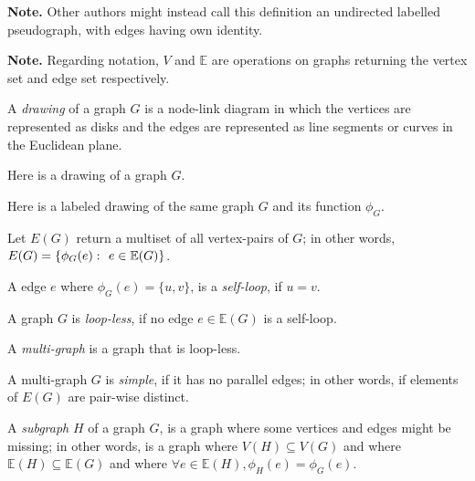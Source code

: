 \documentclass{article}
\begin{document}
	\textbf{Note.} Other authors might instead call this definition an undirected labelled pseudograph, with edges having own identity.
	
	\textbf{Note.} Regarding notation, $V$ and $\mathbb{E}$ are operations on graphs returning the vertex set and edge set respectively.

	A \textit{drawing} of a graph $G$ is a node-link diagram in which the vertices are represented as disks and the edges are represented as line segments or curves in the Euclidean plane.

	Here is a drawing of a graph $G$.

	\begin{center}
		
	\end{center}

	Here is a labeled drawing of the same graph $G$ and its function $\phi_G$.

	\begin{center}
		
	\end{center}

	Let $E(G)$ return a multiset of all vertex-pairs of $G$; in other words, $E(G) = \{\phi_G(e) \,\colon\  e \in \mathbb{E}(G)\}$.

	A edge $e$ where $\phi_G(e) = \{u,v\}$, is a \textit{self-loop}, if $u = v$.

	A graph $G$ is \textit{loop-less}, if no edge $e \in \mathbb{E}(G)$ is a self-loop.

	A \textit{multi-graph} is a graph that is loop-less.

	\begin{center}
		
	\end{center}

	A multi-graph $G$ is \textit{simple}, if it has no parallel edges; in other words, if elements of $E(G)$ are pair-wise distinct.

	\begin{center}
		
	\end{center}

	A \textit{subgraph} $H$ of a graph $G$, is a graph where some vertices and edges might be missing; in other words, is a graph where $V(H) \subseteq V(G)$ and where $\mathbb{E}(H) \subseteq \mathbb{E}(G)$ and where $\forall e \in \mathbb{E}(H), \phi_H(e) = \phi_G(e)$.

	\begin{center}
		
	\end{center}
\end{document}
